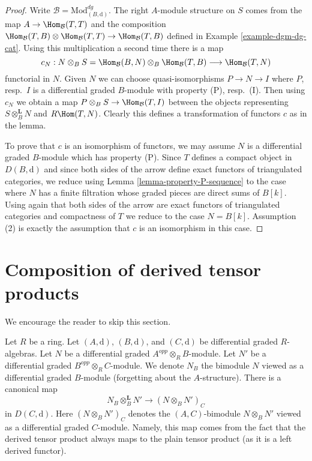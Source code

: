 \begin{proof}
Write $\mathcal{B} = \text{Mod}^{dg}_{(B, \text{d})}$.
The right $A$-module structure on $S$ comes from the map
$A \to \Hom_\mathcal{B}(T, T)$ and the composition
$\Hom_\mathcal{B}(T, B) \otimes \Hom_\mathcal{B}(T, T)
\to \Hom_\mathcal{B}(T, B)$ defined in Example \ref{example-dgm-dg-cat}.
Using this multiplication a second time there is a map
$$
c_N :
N \otimes_B S = \Hom_\mathcal{B}(B, N) \otimes_B \Hom_\mathcal{B}(T, B)
\longrightarrow
\Hom_\mathcal{B}(T, N)
$$
functorial in $N$. Given $N$ we can choose quasi-isomorphisms
$P \to N \to I$ where $P$, resp.\ $I$ is a differential graded $B$-module
with property (P), resp.\ (I). Then using $c_N$ we obtain a map
$P \otimes_B S \to \Hom_\mathcal{B}(T, I)$ between the objects
representing $S \otimes_B^\mathbf{L} N$ and $R\Hom(T, N)$.
Clearly this defines a transformation of functors $c$ as in the lemma.

\medskip\noindent
To prove that $c$ is an isomorphism of functors, we may
assume $N$ is a differential graded $B$-module which
has property (P). Since $T$ defines a compact object in
$D(B, \text{d})$ and since both sides of the arrow define
exact functors of triangulated categories, we reduce using
Lemma \ref{lemma-property-P-sequence}
to the case where $N$ has a finite filtration whose
graded pieces are direct sums of $B[k]$. Using again that
both sides of the arrow are exact functors of triangulated
categories and compactness of $T$ we reduce to
the case $N = B[k]$. Assumption (2) is exactly the
assumption that $c$ is an isomorphism in this case.
\end{proof}






\section{Composition of derived tensor products}
\label{section-compose-tensor-functors}

\noindent
We encourage the reader to skip this section.

\medskip\noindent
Let $R$ be a ring. Let $(A, \text{d})$, $(B, \text{d})$, and
$(C, \text{d})$ be differential graded $R$-algebras.
Let $N$ be a differential graded $A^{opp} \otimes_R B$-module.
Let $N'$ be a differential graded $B^{opp} \otimes_R C$-module.
We denote $N_B$ the bimodule $N$ viewed as a differential graded
$B$-module (forgetting about the $A$-structure). There is a canonical map
\begin{equation}
\label{equation-plain-versus-derived}
N_B \otimes_B^\mathbf{L} N'
\longrightarrow
(N \otimes_B N')_C
\end{equation}
in $D(C, \text{d})$. Here $(N \otimes_B N')_C$ denotes the
$(A, C)$-bimodule $N \otimes_B N'$ viewed as a
differential graded $C$-module. Namely, this map
comes from the fact that the derived tensor product always maps to the
plain tensor product (as it is a left derived functor).

